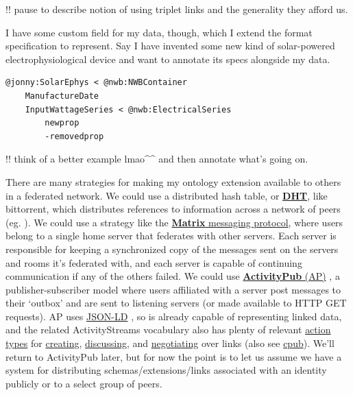 \documentclass[10pt]{tufte-book}
\begin{document}
!! pause to describe notion of using triplet links and the generality
they afford us.

I have some custom field for my data, though, which I extend the format
specification to represent. Say I have invented some new kind of
solar-powered electrophysiological device and want to annotate its specs
alongside my data.

\begin{verbatim}
@jonny:SolarEphys < @nwb:NWBContainer
    ManufactureDate
    InputWattageSeries < @nwb:ElectricalSeries
        newprop
        -removedprop
\end{verbatim}

!! think of a better example lmao\^{}\^{} and then annotate what's going
on.

There are many strategies for making my ontology extension available to
others in a federated network. We could use a distributed hash table, or
\href{https://en.wikipedia.org/wiki/Distributed_hash_table}{\textbf{DHT}},
like bittorrent, which distributes references to information across a
network of peers (eg. \citep{pirroDHTbasedSemanticOverlay2012} ).
We could use a strategy like the
\href{https://matrix.org/}{\textbf{Matrix} messaging protocol}, where
users belong to a single home server that federates with other servers.
Each server is responsible for keeping a synchronized copy of the
messages sent on the servers and rooms it's federated with, and each
server is capable of continuing communication if any of the others
failed. We could use
\href{https://www.w3.org/TR/2018/REC-activitypub-20180123/}{\textbf{ActivityPub}
(AP)} \citep{Webber:18:A} , a publisher-subscriber model where
users affiliated with a server post messages to their `outbox' and are
sent to listening servers (or made available to HTTP GET requests). AP
uses \href{https://json-ld.org/}{JSON-LD} \citep{spornyJSONLDJSONbasedSerialization2020} , so is already capable of
representing linked data, and the related ActivityStreams vocabulary
\citep{snellActivityStreams2017}  also has plenty of relevant
\href{https://www.w3.org/TR/activitystreams-vocabulary/\#activity-types}{action
types} for
\href{https://www.w3.org/TR/activitystreams-vocabulary/\#dfn-create}{creating},
\href{https://www.w3.org/TR/activitystreams-vocabulary/\#dfn-question}{discussing},
and
\href{https://www.w3.org/TR/activitystreams-vocabulary/\#dfn-tentativeaccept}{negotiating}
over links (also see
\href{https://github.com/openEngiadina/cpub}{cpub}). We'll return to
ActivityPub later, but for now the point is to let us assume we have a
system for distributing schemas/extensions/links associated with an
identity publicly or to a select group of peers.
\end{document}
